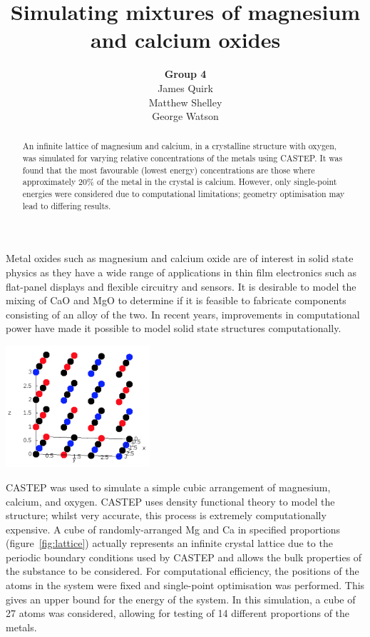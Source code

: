 \documentclass[a4paper,12pt]{article}
\title{Simulating mixtures of magnesium and calcium oxides}
\author{\textbf{Group 4}\\
	James Quirk\\
	Matthew Shelley\\
	George Watson}
\date{}
\begin{document}
\maketitle

\begin{abstract}
    An infinite lattice of magnesium and calcium, in a crystalline structure with oxygen, was simulated for varying relative concentrations of the metals using CASTEP. It was found that the most favourable (lowest energy) concentrations are those where approximately 20\% of the metal in the crystal is calcium. However, only single-point energies were considered due to computational limitations; geometry optimisation may lead to differing results.
\end{abstract}

\begin{multicols}{2}
	
	Metal oxides such as magnesium and calcium oxide are of interest in solid state physics as they have a wide range of applications in thin film electronics such as flat-panel displays and flexible circuitry and sensors.\cite{kim2011lowtemperature} It is desirable to model the mixing of CaO and MgO to determine if it is feasible to fabricate components consisting of an alloy of the two. In recent years, improvements in computational power have made it possible to model solid state structures computationally.
	\begin{center}
	    \includegraphics[keepaspectratio=true,width=0.4\textwidth]{lattice}
			\label{fig:lattice} 
	\end{center}
	CASTEP\cite{clark2009first} was used to simulate a simple cubic arrangement of magnesium, calcium, and oxygen. CASTEP uses density functional theory to model the structure; whilst very accurate, this process is extremely computationally expensive. A cube of randomly-arranged Mg and Ca in specified proportions (figure~\ref{fig:lattice}) actually represents an infinite crystal lattice due to the periodic boundary conditions used by CASTEP and allows the bulk properties of the substance to be considered. For computational efficiency, the positions of the atoms in the system were fixed and single-point optimisation was performed. This gives an upper bound for the energy of the system. In this simulation, a cube of 27 atoms was considered, allowing for testing of 14 different proportions of the metals.
	

\end{multicols}
\end{document}
